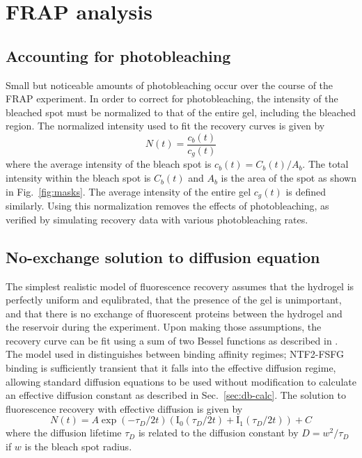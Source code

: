 \section{FRAP analysis}
\label{sec:FRAP-analysis}

\subsection{Accounting for photobleaching}
Small but noticeable amounts of photobleaching occur over the course of the FRAP experiment.  In order to correct for photobleaching, the intensity of the bleached spot must be normalized to that of the entire gel, including the bleached region.  The normalized intensity used to fit the recovery curves is given by
\begin{equation}
N(t) = \frac{c_b(t)}{c_g(t)}
\end{equation} where the average intensity of the bleach spot is $c_b(t) = C_b(t)/A_b$. The total intensity within the bleach spot is $C_b(t)$ and $A_b$ is the area of the spot as shown in Fig.~\ref{fig:masks}.  The average intensity of the entire gel $c_g(t)$ is defined similarly.  Using this normalization removes the effects of photobleaching, as verified by simulating recovery data with various photobleaching rates.

\subsection{No-exchange solution to diffusion equation}

The simplest realistic model of fluorescence recovery assumes that the hydrogel is perfectly uniform and equlibrated, that the presence of the gel is unimportant, and that there is no exchange of fluorescent proteins between the hydrogel and the reservoir during the experiment.  Upon making those assumptions, the recovery curve can be fit using a sum of two Bessel functions as described in \cite{yang18,sprague04}.  The model used in \cite{sprague04} distinguishes between binding affinity regimes; NTF2-FSFG binding is sufficiently transient that it falls into the effective diffusion regime, allowing standard diffusion equations to be used without modification to calculate an effective diffusion constant as described in Sec.~\ref{sec:db-calc}.  The solution to fluorescence recovery with effective diffusion is given by
\begin{equation}
N(t) = A\exp(-\tau_D/2t)\left(\mathrm{I}_0(\tau_D/2t)+\mathrm{I}_1(\tau_D/2t)\right)+C
\end{equation} where the diffusion lifetime $\tau_D$ is related to the diffusion constant by $D = w^2/\tau_D$ if $w$ is the bleach spot radius.  

